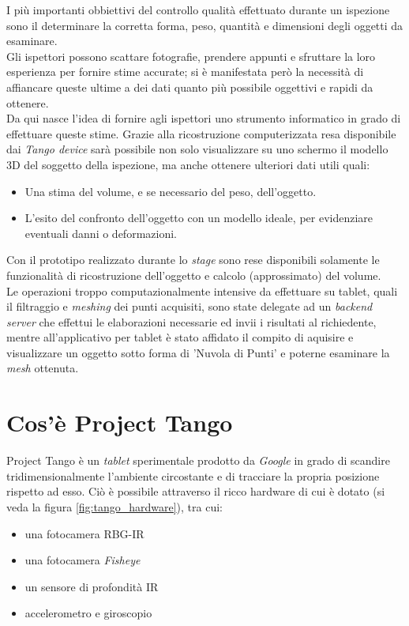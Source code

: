 I più importanti obbiettivi del controllo qualità effettuato durante un ispezione sono il determinare la corretta forma, peso, quantità e dimensioni degli oggetti da esaminare.\\
Gli ispettori possono scattare fotografie, prendere appunti e sfruttare la loro esperienza per fornire stime accurate; si è manifestata però la necessità di affiancare queste ultime a dei dati quanto più possibile oggettivi e rapidi da ottenere.\\
Da qui nasce l'idea di fornire agli ispettori uno strumento informatico in grado di effettuare queste stime. Grazie alla ricostruzione computerizzata resa disponibile dai \emph{Tango device} sarà possibile non solo visualizzare su uno schermo il modello 3D del soggetto della ispezione, ma anche ottenere ulteriori dati utili quali:
\begin{itemize}
	\item Una stima del volume, e se necessario del peso, dell'oggetto.
	\item L'esito del confronto dell'oggetto con un modello ideale, per evidenziare eventuali danni o deformazioni.
\end{itemize}
Con il prototipo realizzato durante lo \emph{stage} sono rese disponibili solamente le funzionalità di ricostruzione dell'oggetto e calcolo (approssimato) del volume.\\
Le operazioni troppo computazionalmente intensive da effettuare su tablet, quali il filtraggio e \emph{meshing} dei punti acquisiti, sono state delegate ad un \emph{backend server} che effettui le elaborazioni necessarie ed invii i risultati al richiedente, mentre all'applicativo per tablet è stato affidato il compito di aquisire e visualizzare un oggetto sotto forma di 'Nuvola di Punti' e poterne esaminare la \emph{mesh} ottenuta.

\section{Cos'è Project Tango}

Project Tango è un \emph{tablet} sperimentale prodotto da \emph{Google} in grado di scandire tridimensionalmente l'ambiente circostante e di tracciare la propria posizione rispetto ad esso. Ciò è possibile attraverso il ricco hardware di cui è dotato (si veda la figura \ref{fig:tango_hardware}), tra cui:
\begin{itemize}
\item una fotocamera RBG-IR\\
\item una fotocamera \emph{Fisheye}\\
\item un sensore di profondità IR\\
\item accelerometro e giroscopio\\
\end{itemize}

